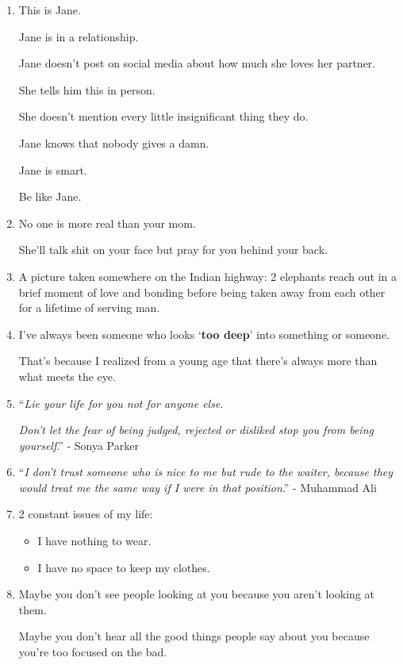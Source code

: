 \documentclass{article}
\numberwithin{equation}{section}
\begin{document}
\begin{enumerate}
    Like seriously?
    
    You actually listened to me thank you.
    \item This is Jane.
    
    Jane is in a relationship.
    
    Jane doesn't post on social media about how much she loves her partner.
    
    She tells him this in person.
    
    She doesn't mention every little insignificant thing they do.
    
    Jane knows that nobody gives a damn.
    
    Jane is smart.
    
    Be like Jane.
    \item No one is more real than your mom.
    
    She'll talk shit on your face but pray for you behind your back.
    \item \textsf{A picture taken somewhere on the Indian highway: 2 elephants reach out in a brief moment of love and bonding before being taken away from each other for a lifetime of serving man.}
    \item I've always been someone who looks `\textbf{too deep}' into something or someone.
    
    That's because I realized from a young age that there's always more than what meets the eye.
    \item ``\textit{Lie your life for you not for anyone else}.
    
    \textit{Don't let the fear of being judged, rejected or disliked stop you from being yourself}.'' - Sonya Parker
    \item ``\textit{I don't trust someone who is nice to me but rude to the waiter, because they would treat me the same way if I were in that position}.'' - Muhammad Ali
    \item 2 constant issues of my life:
    \begin{itemize}
        \item[1.] I have nothing to wear.
        \item[2.] I have no space to keep my clothes.
    \end{itemize}
    \item Maybe you don't see people looking at you because you aren't looking at them.
    
    Maybe you don't hear all the good things people say about you because you're too focused on the bad.
    

\end{enumerate}
\end{document}
